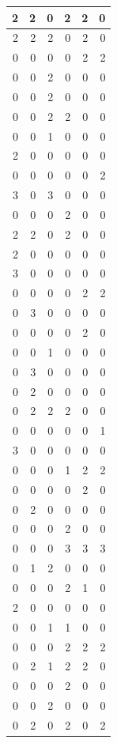\documentclass[
  12pt,
]{krantz}
\begin{document}
\begin{tabular}{r|r|r|r|r|r}
\hline
2 & 2 & 0 & 2 & 2 & 0\\
\hline
2 & 2 & 2 & 0 & 2 & 0\\
\hline
0 & 0 & 0 & 0 & 2 & 2\\
\hline
0 & 0 & 2 & 0 & 0 & 0\\
\hline
0 & 0 & 2 & 0 & 0 & 0\\
\hline
0 & 0 & 2 & 2 & 0 & 0\\
\hline
0 & 0 & 1 & 0 & 0 & 0\\
\hline
2 & 0 & 0 & 0 & 0 & 0\\
\hline
0 & 0 & 0 & 0 & 0 & 2\\
\hline
3 & 0 & 3 & 0 & 0 & 0\\
\hline
0 & 0 & 0 & 2 & 0 & 0\\
\hline
2 & 2 & 0 & 2 & 0 & 0\\
\hline
2 & 0 & 0 & 0 & 0 & 0\\
\hline
3 & 0 & 0 & 0 & 0 & 0\\
\hline
0 & 0 & 0 & 0 & 2 & 2\\
\hline
0 & 3 & 0 & 0 & 0 & 0\\
\hline
0 & 0 & 0 & 0 & 2 & 0\\
\hline
0 & 0 & 1 & 0 & 0 & 0\\
\hline
0 & 3 & 0 & 0 & 0 & 0\\
\hline
0 & 2 & 0 & 0 & 0 & 0\\
\hline
0 & 2 & 2 & 2 & 0 & 0\\
\hline
0 & 0 & 0 & 0 & 0 & 1\\
\hline
3 & 0 & 0 & 0 & 0 & 0\\
\hline
0 & 0 & 0 & 1 & 2 & 2\\
\hline
0 & 0 & 0 & 0 & 2 & 0\\
\hline
0 & 2 & 0 & 0 & 0 & 0\\
\hline
0 & 0 & 0 & 2 & 0 & 0\\
\hline
0 & 0 & 0 & 3 & 3 & 3\\
\hline
0 & 1 & 2 & 0 & 0 & 0\\
\hline
0 & 0 & 0 & 2 & 1 & 0\\
\hline
2 & 0 & 0 & 0 & 0 & 0\\
\hline
0 & 0 & 1 & 1 & 0 & 0\\
\hline
0 & 0 & 0 & 2 & 2 & 2\\
\hline
0 & 2 & 1 & 2 & 2 & 0\\
\hline
0 & 0 & 0 & 2 & 0 & 0\\
\hline
0 & 0 & 2 & 0 & 0 & 0\\
\hline
0 & 2 & 0 & 2 & 0 & 2\\

\end{tabular}
\end{document}
